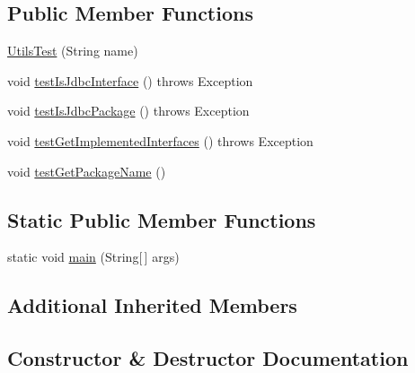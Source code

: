 \subsection*{Public Member Functions}
\begin{DoxyCompactItemize}
\item 
\mbox{\hyperlink{classtestsuite_1_1simple_1_1_utils_test_ae8295b4d62a676991726c1e76e0192e9}{Utils\+Test}} (String name)
\item 
void \mbox{\hyperlink{classtestsuite_1_1simple_1_1_utils_test_a5983623d2b264a98e4d7a3859d1404c7}{test\+Is\+Jdbc\+Interface}} ()  throws Exception 
\item 
void \mbox{\hyperlink{classtestsuite_1_1simple_1_1_utils_test_acdd7d8143bc1dede650e3c5991d92193}{test\+Is\+Jdbc\+Package}} ()  throws Exception 
\item 
void \mbox{\hyperlink{classtestsuite_1_1simple_1_1_utils_test_a173e24f02866b3c9a9356d28077db9b3}{test\+Get\+Implemented\+Interfaces}} ()  throws Exception 
\item 
void \mbox{\hyperlink{classtestsuite_1_1simple_1_1_utils_test_a15e2df447f329b76ef2115f6583296c0}{test\+Get\+Package\+Name}} ()
\end{DoxyCompactItemize}
\subsection*{Static Public Member Functions}
\begin{DoxyCompactItemize}
\item 
static void \mbox{\hyperlink{classtestsuite_1_1simple_1_1_utils_test_a131ce08ba1049981947b3982e95d9e34}{main}} (String\mbox{[}$\,$\mbox{]} args)
\end{DoxyCompactItemize}
\subsection*{Additional Inherited Members}


\subsection{Constructor \& Destructor Documentation}
\mbox{\label{classtestsuite_1_1simple_1_1_utils_test_ae8295b4d62a676991726c1e76e0192e9}} 
